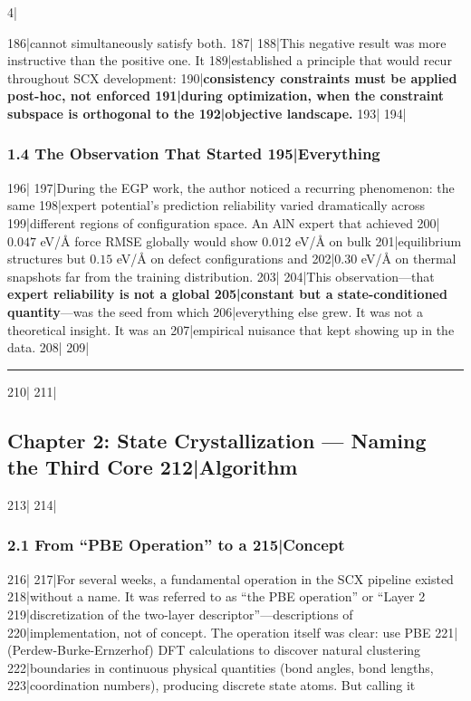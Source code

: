 4|\documentclass[
5|  12pt,
6|]{article}
\begin{document}
186|cannot simultaneously satisfy both.
187|
188|This negative result was more instructive than the positive one. It
189|established a principle that would recur throughout SCX development:
190|\textbf{consistency constraints must be applied post-hoc, not enforced
191|during optimization, when the constraint subspace is orthogonal to the
192|objective landscape.}
193|
194|\subsubsection{1.4 The Observation That Started
195|Everything}\label{the-observation-that-started-everything}
196|
197|During the EGP work, the author noticed a recurring phenomenon: the same
198|expert potential's prediction reliability varied dramatically across
199|different regions of configuration space. An AlN expert that achieved
200|\(0.047\) eV/Å force RMSE globally would show \(0.012\) eV/Å on bulk
201|equilibrium structures but \(0.15\) eV/Å on defect configurations and
202|\(0.30\) eV/Å on thermal snapshots far from the training distribution.
203|
204|This observation---that \textbf{expert reliability is not a global
205|constant but a state-conditioned quantity}---was the seed from which
206|everything else grew. It was not a theoretical insight. It was an
207|empirical nuisance that kept showing up in the data.
208|
209|\begin{center}\rule{0.5\linewidth}{0.5pt}\end{center}
210|
211|\subsection{Chapter 2: State Crystallization --- Naming the Third Core
212|Algorithm}\label{chapter-2-state-crystallization-naming-the-third-core-algorithm}
213|
214|\subsubsection{2.1 From ``PBE Operation'' to a
215|Concept}\label{from-pbe-operation-to-a-concept}
216|
217|For several weeks, a fundamental operation in the SCX pipeline existed
218|without a name. It was referred to as ``the PBE operation'' or ``Layer 2
219|discretization of the two-layer descriptor''---descriptions of
220|implementation, not of concept. The operation itself was clear: use PBE
221|(Perdew-Burke-Ernzerhof) DFT calculations to discover natural clustering
222|boundaries in continuous physical quantities (bond angles, bond lengths,
223|coordination numbers), producing discrete state atoms. But calling it
\end{document}
